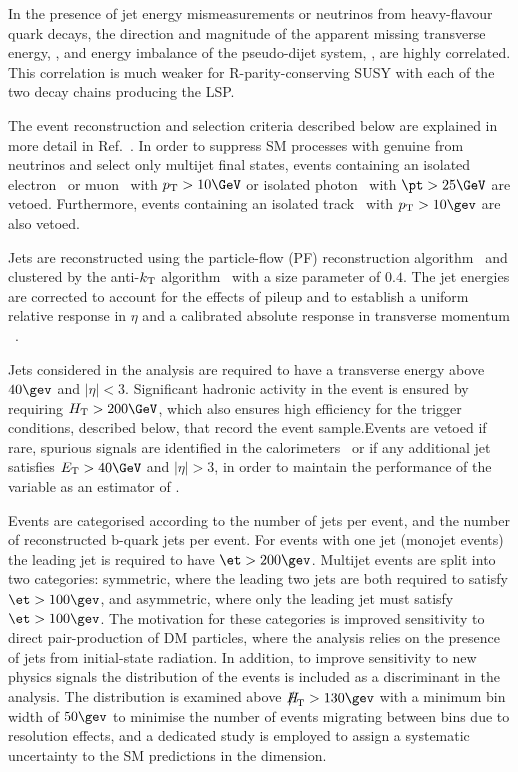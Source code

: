 In the presence of jet energy mismeasurements or neutrinos from
heavy-flavour quark decays, the direction and magnitude of the
apparent missing transverse energy, \mht, and energy imbalance of the
pseudo-dijet system, \dht, are highly correlated. This correlation is
much weaker for R-parity-conserving SUSY with each of the two decay
chains producing the LSP.

The event reconstruction and selection criteria described below are
explained in more detail in Ref.~\cite{RA1Paper2012}.
In order to suppress SM processes with genuine \met from neutrinos and
select only multijet final states, events containing an isolated
electron~\cite{PAS-EGM-10-004} or muon~\cite{PAS-MUO-10-004} with $\Pt
> 10\GeV$ or isolated photon~\cite{PAS-EGM-10-006} with $\pt > 25\GeV$
are vetoed. Furthermore, events containing an isolated
track~\cite{single-lepton-stop} with $\Pt > 10\gev$ are also vetoed.

Jets are reconstructed using the particle-flow (PF) reconstruction
algorithm~\cite{CMS-PAS-PFT-09-001, CMS-PAS-PFT-10-001} and 
clustered by the anti-$k_{\rm T}$ algorithm~\cite{antikt} with
a size parameter of $0.4$. The jet energies are corrected to account for the effects of pileup
and to establish a uniform relative response in $\eta$ and a
calibrated absolute response in transverse momentum
\pt~\cite{2011arXiv1107.4277C}.

Jets considered in the analysis are required to have a transverse
energy above $40\gev$ and $|\eta| < 3$. Significant hadronic activity
in the event is ensured by requiring $\scalht > 200\GeV$, which also
ensures high efficiency for the trigger conditions, described below,
that record the event sample.Events are vetoed if rare, spurious signals are identified in the
calorimeters~\cite{1748-0221-5-03-T03014, CMS-NOTE-2010-012} or if any
additional jet satisfies $\Et > 40\GeV$ and $|\eta| > 3$, in order to
maintain the performance of the variable \mht as an estimator of \met.

Events are categorised according to the number of jets per event,
and the number of reconstructed b-quark jets
per event. For events with one jet (monojet events) the leading jet is required to have $\et > 200\gev$. Multijet events are split into two categories: symmetric, where the leading two jets are both required to satisfy $\et > 100\gev$, and asymmetric, where only the leading jet must satisfy $\et > 100\gev$. The motivation for these categories is improved sensitivity to direct pair-production of DM particles, where the analysis relies on the presence of jets from initial-state radiation. In addition, to improve sensitivity to new physics signals the \mht distribution of the events is included as a discriminant in the analysis. The \mht distribution is examined above $\mht > 130\gev$ with a minimum  bin width of $50\gev$ to minimise the number of events migrating between bins due to resolution effects, and a dedicated study is employed to assign a systematic uncertainty to the SM predictions in the \mht dimension.

